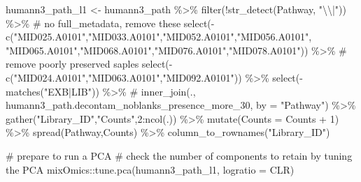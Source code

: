 \documentclass[
  letterpaper,
]{book}
\newenvironment{Shaded}{}{}
\newcommand{\AttributeTok}[1]{\textcolor[rgb]{0.84,0.23,0.29}{#1}}
\newcommand{\CommentTok}[1]{\textcolor[rgb]{0.42,0.45,0.49}{#1}}
\newcommand{\DecValTok}[1]{\textcolor[rgb]{0.00,0.36,0.77}{#1}}
\newcommand{\FunctionTok}[1]{\textcolor[rgb]{0.44,0.26,0.76}{#1}}
\newcommand{\NormalTok}[1]{\textcolor[rgb]{0.14,0.16,0.18}{#1}}
\newcommand{\OtherTok}[1]{\textcolor[rgb]{0.44,0.26,0.76}{#1}}
\newcommand{\SpecialCharTok}[1]{\textcolor[rgb]{0.00,0.36,0.77}{#1}}
\newcommand{\StringTok}[1]{\textcolor[rgb]{0.01,0.18,0.38}{#1}}
\begin{document}
\begin{Shaded}
\begin{Highlighting}[]

\NormalTok{humann3\_path\_l1 }\OtherTok{\textless{}{-}}\NormalTok{ humann3\_path }\SpecialCharTok{\%\textgreater{}\%}
  \FunctionTok{filter}\NormalTok{(}\SpecialCharTok{!}\FunctionTok{str\_detect}\NormalTok{(Pathway, }\StringTok{"}\SpecialCharTok{\textbackslash{}\textbackslash{}}\StringTok{|"}\NormalTok{)) }\SpecialCharTok{\%\textgreater{}\%}
  \CommentTok{\# no full\_metadata, remove these}
  \FunctionTok{select}\NormalTok{(}\SpecialCharTok{{-}}\FunctionTok{c}\NormalTok{(}\StringTok{"MID025.A0101"}\NormalTok{,}\StringTok{"MID033.A0101"}\NormalTok{,}\StringTok{"MID052.A0101"}\NormalTok{,}\StringTok{"MID056.A0101"}\NormalTok{,}
            \StringTok{"MID065.A0101"}\NormalTok{,}\StringTok{"MID068.A0101"}\NormalTok{,}\StringTok{"MID076.A0101"}\NormalTok{,}\StringTok{"MID078.A0101"}\NormalTok{)) }\SpecialCharTok{\%\textgreater{}\%}
  \CommentTok{\# remove poorly preserved saples}
  \FunctionTok{select}\NormalTok{(}\SpecialCharTok{{-}}\FunctionTok{c}\NormalTok{(}\StringTok{"MID024.A0101"}\NormalTok{,}\StringTok{"MID063.A0101"}\NormalTok{,}\StringTok{"MID092.A0101"}\NormalTok{)) }\SpecialCharTok{\%\textgreater{}\%}
  \FunctionTok{select}\NormalTok{(}\SpecialCharTok{{-}}\FunctionTok{matches}\NormalTok{(}\StringTok{"EXB|LIB"}\NormalTok{)) }\SpecialCharTok{\%\textgreater{}\%}
  \CommentTok{\# inner\_join(., humann3\_path.decontam\_noblanks\_presence\_more\_30, by = "Pathway") \%\textgreater{}\%}
  \FunctionTok{gather}\NormalTok{(}\StringTok{"Library\_ID"}\NormalTok{,}\StringTok{"Counts"}\NormalTok{,}\DecValTok{2}\SpecialCharTok{:}\FunctionTok{ncol}\NormalTok{(.)) }\SpecialCharTok{\%\textgreater{}\%}
  \FunctionTok{mutate}\NormalTok{(}\AttributeTok{Counts =}\NormalTok{ Counts }\SpecialCharTok{+} \DecValTok{1}\NormalTok{) }\SpecialCharTok{\%\textgreater{}\%}
  \FunctionTok{spread}\NormalTok{(Pathway,Counts) }\SpecialCharTok{\%\textgreater{}\%}
  \FunctionTok{column\_to\_rownames}\NormalTok{(}\StringTok{"Library\_ID"}\NormalTok{)}

\CommentTok{\# prepare to run a PCA}
\CommentTok{\# check the number of components to retain by tuning the PCA}
\NormalTok{mixOmics}\SpecialCharTok{::}\FunctionTok{tune.pca}\NormalTok{(humann3\_path\_l1, }\AttributeTok{logratio =} \StringTok{\textquotesingle{}CLR\textquotesingle{}}\NormalTok{)}



\end{Highlighting}
\end{Shaded}
\end{document}
